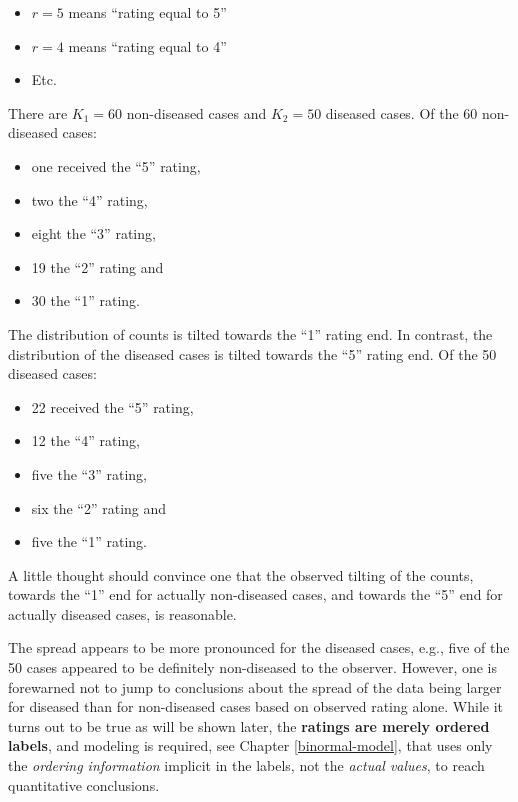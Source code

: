 \documentclass[
]{book}
\providecommand{\tightlist}{%
  \setlength{\itemsep}{0pt}\setlength{\parskip}{0pt}}
\begin{document}
\begin{itemize}
\tightlist
\item
  \(r = 5\) means ``rating equal to 5''
\item
  \(r = 4\) means ``rating equal to 4''
\item
  Etc.
\end{itemize}

There are \(K_1 = 60\) non-diseased cases and \(K_2 = 50\) diseased cases. Of the 60 non-diseased cases:

\begin{itemize}
\tightlist
\item
  one received the ``5'' rating,
\item
  two the ``4'' rating,
\item
  eight the ``3'' rating,
\item
  19 the ``2'' rating and
\item
  30 the ``1'' rating.
\end{itemize}

The distribution of counts is tilted towards the ``1'' rating end. In contrast, the distribution of the diseased cases is tilted towards the ``5'' rating end. Of the 50 diseased cases:

\begin{itemize}
\tightlist
\item
  22 received the ``5'' rating,
\item
  12 the ``4'' rating,
\item
  five the ``3'' rating,
\item
  six the ``2'' rating and
\item
  five the ``1'' rating.
\end{itemize}

A little thought should convince one that the observed tilting of the counts, towards the ``1'' end for actually non-diseased cases, and towards the ``5'' end for actually diseased cases, is reasonable.

The spread appears to be more pronounced for the diseased cases, e.g., five of the 50 cases appeared to be definitely non-diseased to the observer. However, one is forewarned not to jump to conclusions about the spread of the data being larger for diseased than for non-diseased cases based on observed rating alone. While it turns out to be true as will be shown later, the \textbf{ratings are merely ordered labels}, and modeling is required, see Chapter \ref{binormal-model}, that uses only the \emph{ordering information} implicit in the labels, not the \emph{actual values}, to reach quantitative conclusions.
\end{document}
